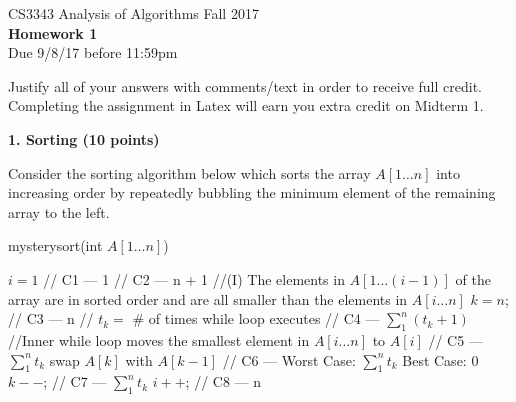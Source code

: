 \documentclass[12pt]{elsart}
\begin{document}
\pagestyle{empty}

\begin{center}
\Large  CS3343 Analysis of Algorithms Fall 2017 \\
\large {\bf Homework 1}\\
\normalsize Due 9/8/17 before 11:59pm
\end{center}

Justify all of your answers with comments/text in order to receive full credit.  Completing the assignment in Latex will earn you extra credit on Midterm 1.

{\bf 1. Sorting (10 points)}

Consider the sorting algorithm below which
sorts the array $A[1\ldots n]$ into increasing order by repeatedly bubbling the
minimum element of the remaining array to the left.

\begin{algorithm}
\caption{mysterysort(int $A[1\ldots n]$)}
 \begin{algorithmic}
 \State $i = 1$ // C1 --- 1
  // C2 --- n + 1
 \State //(I) The elements in $A[1 \ldots (i-1)]$  of the array are in sorted order and are all smaller than the elements in $A[i \ldots n]$
    \State $k = n$; // C3 --- n
		\State // $t_{k} =$ \# of times while loop executes
     // C4 --- $\sum\limits_{1}^{n} (t_{k} + 1)$
	\State //Inner while loop moves the smallest element in $A[i \ldots n]$ to $A[i]$
           // C5 --- $\sum\limits_{1}^{n} t_{k}$
              \State swap $A[k]$ with $A[k-1]$ // C6 --- Worst Case: $\sum\limits_{1}^{n} t_{k}$ Best Case: 0
          \EndIf
       \State $k--$; // C7 --- $\sum\limits_{1}^{n} t_{k}$
     \EndWhile
    \State $i++$; // C8 --- n
  \EndWhile
\end{algorithmic}
\end{algorithm}
\end{document}
